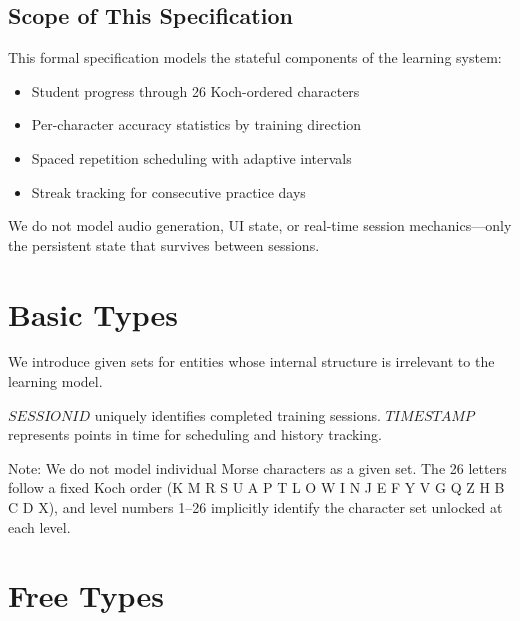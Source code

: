 \documentclass[a4paper,10pt,fleqn]{article}
\begin{document}
\subsection{Scope of This Specification}

This formal specification models the stateful components of the learning system:

\begin{itemize}
\item Student progress through 26 Koch-ordered characters
\item Per-character accuracy statistics by training direction
\item Spaced repetition scheduling with adaptive intervals
\item Streak tracking for consecutive practice days
\end{itemize}

We do not model audio generation, UI state, or real-time session mechanics---only
the persistent state that survives between sessions.

\section{Basic Types}

We introduce given sets for entities whose internal structure is irrelevant to
the learning model.

\begin{zed}
\end{zed}

$SESSIONID$ uniquely identifies completed training sessions.
$TIMESTAMP$ represents points in time for scheduling and history tracking.

Note: We do not model individual Morse characters as a given set. The 26 letters
follow a fixed Koch order (K M R S U A P T L O W I N J E F Y V G Q Z H B C D X),
and level numbers 1--26 implicitly identify the character set unlocked at each level.

\section{Free Types}
\end{document}
